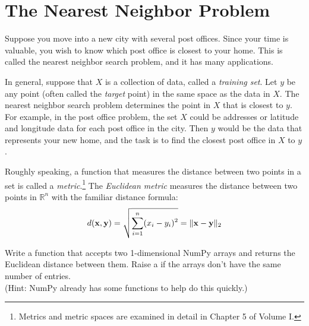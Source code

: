 

\section*{The Nearest Neighbor Problem} %

Suppose you move into a new city with several post offices.
Since your time is valuable, you wish to know which post office is closest to your home.
This is called the nearest neighbor search problem, and it has many applications.

In general, suppose that $X$ is a collection of data, called a \emph{training set}.
Let $y$ be any point (often called the \emph{target} point) in the same space as the data in $X$.
The nearest neighbor search problem determines the point in $X$ that is closest to $y$.
For example, in the post office problem, the set $X$ could be addresses or latitude and longitude data for each post office in the city.
Then $y$ would be the data that represents your new home, and the task is to find the closest post office in $X$ to $y$.

\begin{problem} %
Roughly speaking, a function that measures the distance between two points in a set is called a \emph{metric}.\footnote{Metrics and metric spaces are examined in detail in Chapter 5 of Volume I.}
The \emph{Euclidean metric} measures the distance between two points in $\mathbb{R}^n$ with the familiar distance formula:
\[
d(\mathbf{x},\mathbf{y}) = \sqrt{\displaystyle\sum_{i=1}^n (x_i - y_i)^2} = \| \mathbf{x} - \mathbf{y} \|_2
\]

Write a function that accepts two 1-dimensional NumPy arrays and returns the Euclidean distance between them.
Raise a  if the arrays don't have the same number of entries.
\\
(Hint: NumPy already has some functions to help do this quickly.)
\end{problem}

